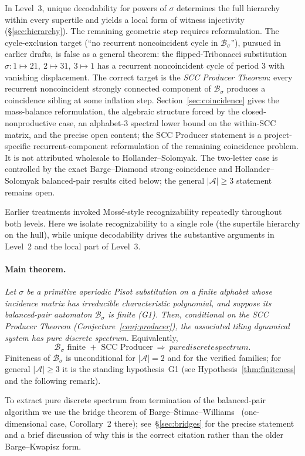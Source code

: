 \documentclass[11pt]{article}
\theoremstyle{plain}
\theoremstyle{definition}
\theoremstyle{remark}
\newcommand{\PDS}{pure discrete spectrum}
\newcommand{\A}{\mathcal{A}}
\newcommand{\B}{\mathcal{B}}
\begin{document}
In Level~3, unique decodability for powers of $\sigma$ determines the full hierarchy within every supertile and yields a local form of witness injectivity (\S\ref{sec:hierarchy}). The remaining geometric step requires reformulation. The cycle-exclusion target (``no recurrent noncoincident cycle in $\B_\sigma$''), pursued in earlier drafts, is false as a general theorem: the flipped-Tribonacci substitution $\sigma:1\mapsto 21,\ 2\mapsto 31,\ 3\mapsto 1$ has a recurrent noncoincident cycle of period 3 with vanishing displacement. The correct target is the \emph{SCC Producer Theorem}: every recurrent noncoincident strongly connected component of $\B_\sigma$ produces a coincidence sibling at some inflation step. Section~\ref{sec:coincidence} gives the mass-balance reformulation, the algebraic structure forced by the closed-nonproductive case, an alphabet-$3$ spectral lower bound on the within-SCC matrix, and the precise open content; the SCC Producer statement is a project-specific recurrent-component reformulation of the remaining coincidence problem. It is not attributed wholesale to Hollander--Solomyak. The two-letter case is controlled by the exact Barge--Diamond strong-coincidence and Hollander--Solomyak balanced-pair results cited below; the general $|\A|\ge 3$ statement remains open.

Earlier treatments invoked Moss\'e-style recognizability repeatedly throughout both levels. Here we isolate recognizability to a single role (the supertile hierarchy on the hull), while unique decodability drives the substantive arguments in Level~2 and the local part of Level~3.

\paragraph{Main theorem.} \emph{Let $\sigma$ be a primitive aperiodic Pisot substitution on a finite alphabet whose incidence matrix has irreducible characteristic polynomial, and suppose its balanced-pair automaton $\B_\sigma$ is finite \textup{(G1)}. Then, conditional on the SCC Producer Theorem (Conjecture~\ref{conj:producer}), the associated tiling dynamical system has \PDS.} Equivalently,
\[
\boxed{\;\B_\sigma\text{ finite }+\text{ SCC Producer}\ \Longrightarrow\ \PDS.\;}
\]
Finiteness of $\B_\sigma$ is unconditional for $|\A|=2$ and for the verified families; for general $|\A|\ge3$ it is the standing hypothesis~G1 (see Hypothesis~\ref{thm:finiteness} and the following remark).

To extract \PDS{} from termination of the balanced-pair algorithm we use the bridge theorem of Barge--\v{S}timac--Williams~\cite{BSW} (one-dimensional case, Corollary~2 there); see~\S\ref{sec:bridges} for the precise statement and a brief discussion of why this is the correct citation rather than the older Barge--Kwapisz form.
\end{document}
